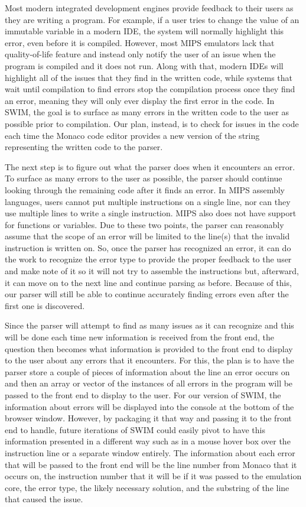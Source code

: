 \documentclass[
    paper=letter,
    parskip=half,
    fontsize=12pt,
    titlepage=firstiscover,
    toc=bibliography,
    numbers=endperiod
]{scrartcl}
\begin{document}
Most modern integrated development engines provide feedback to their
users as they are writing a program. For example, if a user tries to
change the value of an immutable variable in a modern IDE, the system
will normally highlight this error, even before it is compiled. However,
most MIPS emulators lack that quality-of-life feature and instead only
notify the user of an issue when the program is compiled and it does not
run. Along with that, modern IDEs will highlight all of the issues that
they find in the written code, while systems that wait until compilation
to find errors stop the compilation process once they find an error,
meaning they will only ever display the first error in the code. In
SWIM, the goal is to surface as many errors in the written code to the
user as possible prior to compilation. Our plan, instead, is to check
for issues in the code each time the Monaco code editor provides a new
version of the string representing the written code to the parser.

The next step is to figure out what the parser does when it encounters
an error. To surface as many errors to the user as possible, the parser
should continue looking through the remaining code after it finds an
error. In MIPS assembly languages, users cannot put multiple
instructions on a single line, nor can they use multiple lines to write
a single instruction. MIPS also does not have support for functions or
variables. Due to these two points, the parser can reasonably assume
that the scope of an error will be limited to the line(s) that the
invalid instruction is written on. So, once the parser has recognized an
error, it can do the work to recognize the error type to provide the
proper feedback to the user and make note of it so it will not try to
assemble the instructions but, afterward, it can move on to the next
line and continue parsing as before. Because of this, our parser will
still be able to continue accurately finding errors even after the first
one is discovered.

Since the parser will attempt to find as many issues as it can recognize
and this will be done each time new information is received from the
front end, the question then becomes what information is provided to the
front end to display to the user about any errors that it encounters.
For this, the plan is to have the parser store a couple of pieces of
information about the line an error occurs on and then an array or
vector of the instances of all errors in the program will be passed to
the front end to display to the user. For our version of SWIM, the
information about errors will be displayed into the console at the
bottom of the browser window. However, by packaging it that way and
passing it to the front end to handle, future iterations of SWIM could
easily pivot to have this information presented in a different way such
as in a mouse hover box over the instruction line or a separate window
entirely. The information about each error that will be passed to the
front end will be the line number from Monaco that it occurs on, the
instruction number that it will be if it was passed to the emulation
core, the error type, the likely necessary solution, and the substring
of the line that caused the issue.
\end{document}
